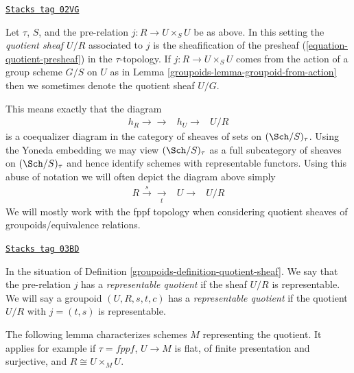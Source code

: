 \begin{definition}
\label{groupoids-definition-quotient-sheaf}
\href{https://stacks.math.columbia.edu/tag/02VG}{\texttt{Stacks tag 02VG}}

Let $\tau$, $S$, and the pre-relation $j : R \to U \times_S U$ be as above.
In this setting the {\it quotient sheaf $U/R$} associated
to $j$ is the sheafification of the presheaf
(\ref{equation-quotient-presheaf}) in the $\tau$-topology.
If $j : R \to U \times_S U$ comes from the action of a group scheme
$G/S$ on $U$ as in Lemma \ref{groupoids-lemma-groupoid-from-action} then we
sometimes denote the quotient sheaf $U/G$.
\end{definition}

This means exactly that the diagram
$$
\begin{array}{ccc}h_R \longrightarrow\longrightarrow & h_U \longrightarrow & U/R\end{array}
$$
is a coequalizer diagram in the category of sheaves of sets
on $(\Sch/S)_\tau$. Using the Yoneda embedding we
may view $(\Sch/S)_\tau$ as a full subcategory of
sheaves on $(\Sch/S)_\tau$ and hence identify schemes
with representable functors. Using this abuse of notation
we will often depict the diagram above simply
$$
\begin{array}{ccc}R \overset{s}{\longrightarrow}\underset{t}{\longrightarrow} & U \longrightarrow & U/R\end{array}
$$
We will mostly work with the fppf topology when considering
quotient sheaves of groupoids/equivalence relations.

\begin{definition}
\label{groupoids-definition-representable-quotient}
\href{https://stacks.math.columbia.edu/tag/03BD}{\texttt{Stacks tag 03BD}}

In the situation of Definition \ref{groupoids-definition-quotient-sheaf}.
We say that the pre-relation $j$ has a
{\it representable quotient} if the sheaf $U/R$ is representable.
We will say a groupoid $(U, R, s, t, c)$ has a
{\it representable quotient}
if the quotient $U/R$ with $j = (t, s)$ is representable.
\end{definition}

The following lemma characterizes schemes $M$ representing the quotient.
It applies for example if $\tau = fppf$, $U \to M$ is flat,
of finite presentation and surjective, and $R \cong U \times_M U$.

